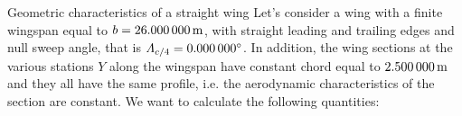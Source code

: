 \documentclass[[12pt,twoside]{book}
\begin{document}
\begin{myExampleX}{Geometric characteristics of a straight wing}{}%
\label{example:Geometric:Characteristics:Of:A:Straight:Wing}
%
\noindent
Let's consider a wing with a finite wingspan equal to $b=\SI[round-precision=1]{\mySpanWingMT}{\metre}$, with straight leading and trailing edges and null sweep angle, that is $\Lambda_{c/4}=\SI[round-precision=0]{\myLambdaCQuarter}{\degree}$.
In addition, the wing sections at the various stations $Y$ along the wingspan have constant chord equal to $\SI[round-precision=2]{\myChordRootWingMT}{\metre}$
and they all have the same profile, i.e. the aerodynamic characteristics of the section are constant. We want to calculate the following quantities:

\medskip


\end{myExampleX}
\end{document}
